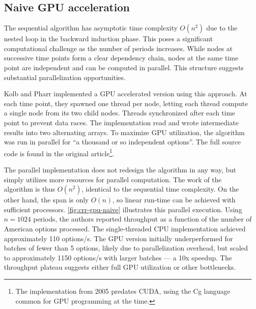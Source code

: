 \documentclass[english,12pt,a4paper,pdftex,sci,utf8]{aaltothesis}
\begin{document}
\subsection{Naive GPU acceleration}
The sequential algorithm has asymptotic time complexity $O(n^2)$ due to the nested loop in the backward induction phase. This poses a significant computational challenge as the number of periods increases. While nodes at successive time points form a clear dependency chain, nodes at the same time point are independent and can be computed in parallel. This structure suggests substantial parallelization opportunities.

Kolb and Pharr \cite{pharr2005gpu} implemented a GPU accelerated version using this approach. At each time point, they spawned one thread per node, letting each thread compute a single node from its two child nodes. Threads synchronized after each time point to prevent data races. The implementation read and wrote intermediate results into two alternating arrays. To maximize GPU utilization, the algorithm was run in parallel for ``a thousand or so independent options''. The full source code is found in the original article\footnote{The implementation from 2005 predates CUDA, using the Cg language common for GPU programming at the time.}.

The parallel implementation does not redesign the algorithm in any way, but simply utilizes more resources for parallel computation. The work of the algorithm is thus $O(n^2)$, identical to the sequential time complexity. On the other hand, the span is only $O(n)$, so linear run-time can be achieved with sufficient processors. \cref{fig:crr-gpu-naive} illustrates this parallel execution. Using $n=1024$ periods, the authors reported throughput as a function of the number of American options processed. The single-threaded CPU implementation achieved approximately 110 options/s. The GPU version initially underperformed for batches of fewer than 5 options, likely due to parallelization overhead, but scaled to approximately 1150 options/s with larger batches --- a 10x speedup. The throughput plateau suggests either full GPU utilization or other bottlenecks.
\end{document}
